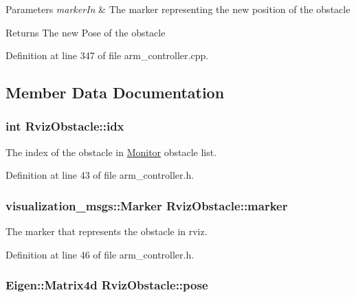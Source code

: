 \begin{DoxyParams}{Parameters}
{\em marker\+In} & The marker representing the new position of the obstacle \\
\hline
\end{DoxyParams}
\begin{DoxyReturn}{Returns}
The new Pose of the obstacle 
\end{DoxyReturn}


Definition at line 347 of file arm\+\_\+controller.\+cpp.



\subsection{Member Data Documentation}
\subsubsection[{\texorpdfstring{idx}{idx}}]{\setlength{\rightskip}{0pt plus 5cm}int Rviz\+Obstacle\+::idx}\hypertarget{class_rviz_obstacle_aac6f99fde043e8d9c0e9d0bab32fd375}{}\label{class_rviz_obstacle_aac6f99fde043e8d9c0e9d0bab32fd375}


The index of the obstacle in \hyperlink{class_monitor}{Monitor} obstacle list. 



Definition at line 43 of file arm\+\_\+controller.\+h.

\subsubsection[{\texorpdfstring{marker}{marker}}]{\setlength{\rightskip}{0pt plus 5cm}visualization\+\_\+msgs\+::\+Marker Rviz\+Obstacle\+::marker}\hypertarget{class_rviz_obstacle_a9edb18553236c56fb49e9d181e0ed052}{}\label{class_rviz_obstacle_a9edb18553236c56fb49e9d181e0ed052}


The marker that represents the obstacle in rviz. 



Definition at line 46 of file arm\+\_\+controller.\+h.

\subsubsection[{\texorpdfstring{pose}{pose}}]{\setlength{\rightskip}{0pt plus 5cm}Eigen\+::\+Matrix4d Rviz\+Obstacle\+::pose}\hypertarget{class_rviz_obstacle_aa48c4d1a26938cb932aac1439373b60b}{}\label{class_rviz_obstacle_aa48c4d1a26938cb932aac1439373b60b}


